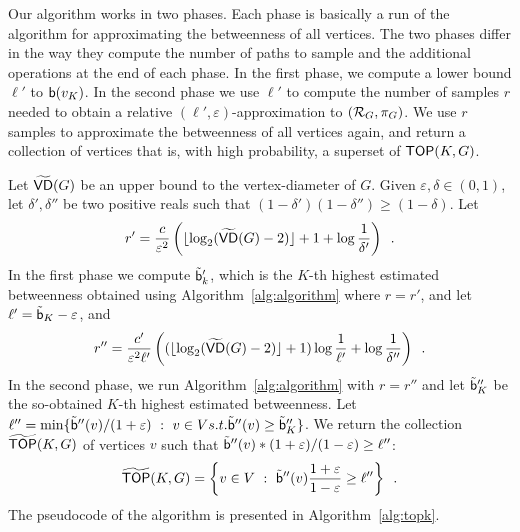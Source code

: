 Our algorithm works in two phases. Each phase is basically a run of the
algorithm for approximating the betweenness of all vertices. %
The two phases differ in the way they compute the number of paths to sample and
the additional operations at the end of each phase. In the first
phase, we compute a lower bound $\ell'$ to $\mathsf{b}(v_K)$. In the second phase we
use $\ell'$ to compute the number of samples $r$ needed to obtain a relative
$(\ell',\varepsilon)$-approximation to $(\mathcal{R}_G,\pi_G)$. We use $r$ samples to approximate the betweenness of all vertices again, and
return a collection of vertices that is, with high probability, a superset of
$\mathsf{TOP}(K,G)$.

Let $\widetilde{\mathsf{VD}}(G)$ be an upper bound to the vertex-diameter of $G$. Given
$\varepsilon,\delta\in(0,1)$, let $\delta',\delta''$ be two positive reals such
that $(1-\delta')(1-\delta'')\ge(1-\delta)$. Let
\[
r'=\frac{c}{\varepsilon^2}\left(\lfloor\log_2(\widetilde{\mathsf{VD}}(G)-2)\rfloor+1+\log\frac{1}{\delta'}\right)\enspace.
\]
In the first phase we compute $\tilde{\mathsf{b}}'_k$, which is the $K$-th highest
estimated betweenness obtained using Algorithm~\ref{alg:algorithm} where $r=r'$,
and let
  $\ell'=\tilde{\mathsf{b}}_K-\varepsilon$, %
and
\[
r''=\frac{c'}{\varepsilon^2\ell'}\left((\lfloor\log_2(\widetilde{\mathsf{VD}}(G)-2)\rfloor+1)\log\frac{1}{\ell'}+\log\frac{1}{\delta''}\right)\enspace.
\]
In the second phase, we run Algorithm~\ref{alg:algorithm} with $r=r''$ and let $\tilde{\mathsf{b}}''_K$ be
the so-obtained $K$-th highest estimated betweenness. Let
$\ell''=\min\{\tilde{\mathsf{b}}''(v) / (1+\varepsilon) ~:~ v\in V \relax{ s.t. }
\tilde{\mathsf{b}}''(v)\ge\tilde{\mathsf{b}}''_K\}$. We
return the collection $\widetilde{\mathsf{TOP}}(K,G)$ of vertices $v$ such that
$\tilde{\mathsf{b}}''(v)*(1+\varepsilon)/(1-\varepsilon)\ge\ell''$:
\[
\widetilde{\mathsf{TOP}}(K,G)= \left\{v\in V ~:~
\tilde{\mathsf{b}}''(v)\frac{1+\varepsilon}{1-\varepsilon}\ge\ell''\right\}\enspace.
\]
\ifproof
The pseudocode of the algorithm is presented in Algorithm~\ref{alg:topk}.


